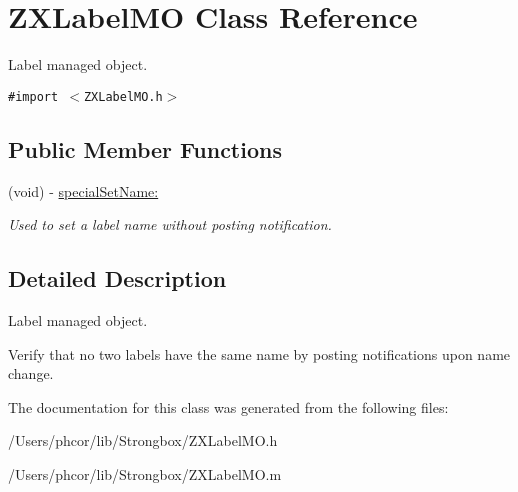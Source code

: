 \hypertarget{interface_z_x_label_m_o}{
\section{ZXLabelMO Class Reference}
\label{interface_z_x_label_m_o}
}
Label managed object.  


{\tt \#import $<$ZXLabelMO.h$>$}

\subsection*{Public Member Functions}
\begin{CompactItemize}
\item 
\hypertarget{interface_z_x_label_m_o_dc62383d23935f9cd45897d5835181dc}{
(void) - \hyperlink{interface_z_x_label_m_o_dc62383d23935f9cd45897d5835181dc}{specialSetName:}}
\label{interface_z_x_label_m_o_dc62383d23935f9cd45897d5835181dc}

\begin{CompactList}\small\item\em Used to set a label name without posting notification. \item\end{CompactList}\end{CompactItemize}


\subsection{Detailed Description}
Label managed object. 

Verify that no two labels have the same name by posting notifications upon name change. 

The documentation for this class was generated from the following files:\begin{CompactItemize}
\item 
/Users/phcor/lib/Strongbox/ZXLabelMO.h\item 
/Users/phcor/lib/Strongbox/ZXLabelMO.m\end{CompactItemize}

